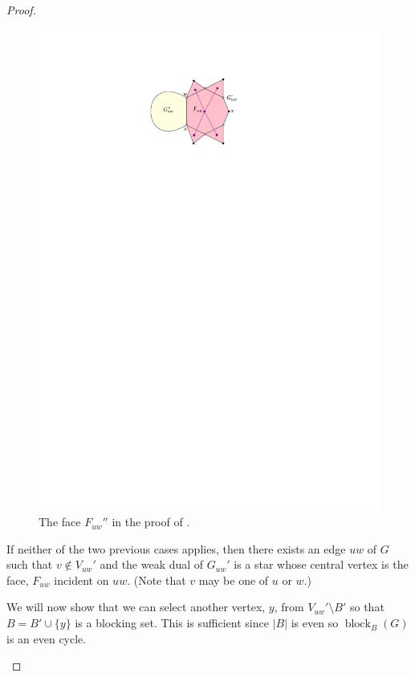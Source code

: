 \documentclass{patmorin}
\DeclareMathOperator{\block}{block}
\begin{document}
\begin{proof}
\begin{enumerate}
  \begin{figure}
    \begin{center}
       \includegraphics{figs/toughie}
    \end{center}
    \caption{The face $F_{uw}''$ in the proof of .}
  \end{figure}

  If neither of the two previous cases applies, then there exists an edge
  $uw$ of $G$ such that $v\not\in V_{uw}'$ and the weak dual of $G_{uw}'$
  is a star whose central vertex is the face, $F_{uw}$ incident on $uw$.
  (Note that $v$ may be one of $u$ or $w$.)

  We will now show that we can select another vertex, $y$, from
  $V_{uw}'\setminus B'$ so that $B=B'\cup\{y\}$ is a blocking set.
  This is sufficient since $|B|$ is even so $\block_B(G)$ is an even
  cycle.  


\end{enumerate}
\end{proof}
\end{document}
